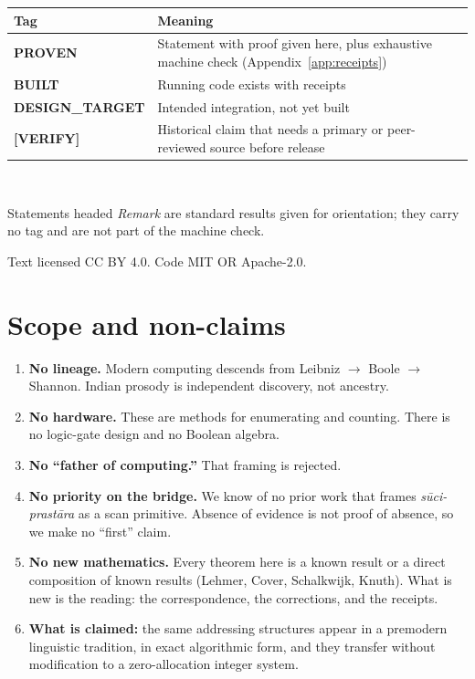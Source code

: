 \documentclass[11pt,letterpaper]{article}
\newcommand{\tagbox}[2]{\textsf{\textbf{\color{#1}#2}}}
\newcommand{\PROVEN}{\tagbox{tagproven}{PROVEN}}
\newcommand{\BUILT}{\tagbox{tagbuilt}{BUILT}}
\newcommand{\DESIGN}{\tagbox{tagdesign}{DESIGN\_TARGET}}
\newcommand{\VERIFY}{\tagbox{tagverify}{[VERIFY]}}
\newcommand{\skt}[1]{\textit{#1}}
\theoremstyle{plain}
\theoremstyle{remark}
\begin{document}
\vspace{4pt}
\begin{center}\small
\begin{tabular}{@{}ll@{}}
\toprule
\textbf{Tag} & \textbf{Meaning}\\
\midrule
\PROVEN & Statement with proof given here, plus exhaustive machine check (Appendix~\ref{app:receipts})\\
\BUILT & Running code exists with receipts\\
\DESIGN & Intended integration, not yet built\\
\VERIFY & Historical claim that needs a primary or peer-reviewed source before release\\
\bottomrule
\end{tabular}\\[4pt]
\parbox{0.86\linewidth}{\footnotesize Statements headed \emph{Remark} are standard results given for orientation; they carry no tag and are not part of the machine check.}
\end{center}

\vfill
{\footnotesize\noindent Text licensed CC BY 4.0. Code MIT OR Apache-2.0.\par}
\newpage

\section{Scope and non-claims}\label{sec:scope}

\begin{enumerate}[label=\arabic*.]
\item \textbf{No lineage.} Modern computing descends from Leibniz $\to$ Boole $\to$ Shannon. Indian prosody is independent discovery, not ancestry.
\item \textbf{No hardware.} These are methods for enumerating and counting. There is no logic-gate design and no Boolean algebra.
\item \textbf{No ``father of computing.''} That framing is rejected.
\item \textbf{No priority on the bridge.} We know of no prior work that frames \skt{sūci-prastāra} as a scan primitive. Absence of evidence is not proof of absence, so we make no ``first'' claim.
\item \textbf{No new mathematics.} Every theorem here is a known result or a direct composition of known results (Lehmer, Cover, Schalkwijk, Knuth). What is new is the reading: the correspondence, the corrections, and the receipts.
\item \textbf{What is claimed:} the same addressing structures appear in a premodern linguistic tradition, in exact algorithmic form, and they transfer without modification to a zero-allocation integer system.
\end{enumerate}
\end{document}
